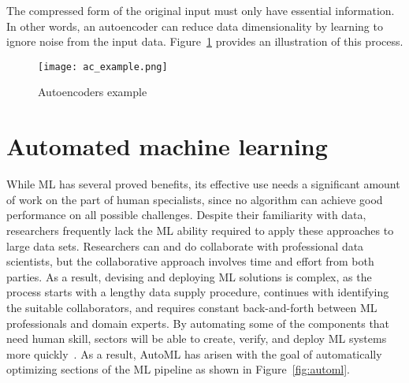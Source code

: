 The compressed form of the original input must only have essential information. In other words, an autoencoder can reduce data dimensionality by learning to ignore noise from the input data. Figure~\ref{fig:ac_example} provides an illustration of this process.

\begin{figure}[htbp]
    \centering
    \texttt{[image: ac\_example.png]}
    \caption{Autoencoders example~\cite{LopezPinaya2020Autoencoders}}
    \label{fig:ac_example}
\end{figure}

\section{Automated machine learning}



While \gls{ML} has several proved benefits, its effective use needs a significant amount of work on the part of human specialists, since no algorithm can achieve good performance on all possible challenges. Despite their familiarity with data, researchers frequently lack the \gls{ML} ability required to apply these approaches to large data sets. Researchers can and do collaborate with professional data scientists, but the collaborative approach involves time and effort from both parties. As a result, devising and deploying \gls{ML} solutions is complex, as the process starts with a lengthy data supply procedure, continues with identifying the suitable collaborators, and requires constant back-and-forth between \gls{ML} professionals and domain experts. By automating some of the components that need human skill, sectors will be able to create, verify, and deploy \gls{ML} systems more quickly~\cite{Waring2020AutomatedHealthcare}. As a result, \gls{AutoML} has arisen with the goal of automatically optimizing sections of the \gls{ML} pipeline as shown in Figure~\ref{fig:automl}. 


